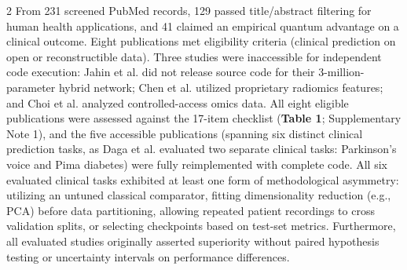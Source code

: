 \documentclass[10pt,a4paper,twoside]{article}
\begin{document}
\begin{multicols}{2}
From 231 screened PubMed records, 129 passed title/abstract filtering for human health applications, and 41 claimed an empirical quantum advantage on a clinical outcome. Eight publications met eligibility criteria (clinical prediction on open or reconstructible data). Three studies were inaccessible for independent code execution: Jahin et al. \cite{jahin2025} did not release source code for their 3-million-parameter hybrid network; Chen et al. \cite{chen2026} utilized proprietary radiomics features; and Choi et al. \cite{choi2026} analyzed controlled-access omics data. All eight eligible publications were assessed against the 17-item checklist (\textbf{Table 1}; Supplementary Note 1), and the five accessible publications (spanning six distinct clinical prediction tasks, as Daga et al. \cite{daga2026} evaluated two separate clinical tasks: Parkinson's voice and Pima diabetes) were fully reimplemented with complete code. All six evaluated clinical tasks exhibited at least one form of methodological asymmetry: utilizing an untuned classical comparator, fitting dimensionality reduction (e.g., PCA) before data partitioning, allowing repeated patient recordings to cross validation splits, or selecting checkpoints based on test-set metrics. Furthermore, all evaluated studies originally asserted superiority without paired hypothesis testing or uncertainty intervals on performance differences.

\end{multicols}
\end{document}
